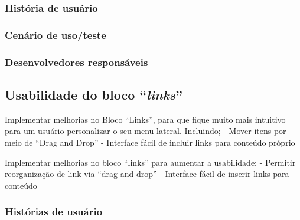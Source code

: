 \subsubsection*{História de usuário}

\subsubsection*{Cenário de uso/teste}

\subsubsection*{Desenvolvedores responsáveis}
 
\subsection{Usabilidade do bloco ``\textit{links}''}


Implementar melhorias no Bloco ``Links'', para que fique muito mais intuitivo para um usuário personalizar o seu menu lateral. Incluindo;
- Mover itens por meio de ``Drag and Drop''
- Interface fácil de incluir links para conteúdo próprio

Implementar melhorias no bloco ``links'' para aumentar a usabilidade:
  - Permitir reorganização de link via ``drag and drop''
  - Interface fácil de inserir links para conteúdo

\subsubsection*{Histórias de usuário}

